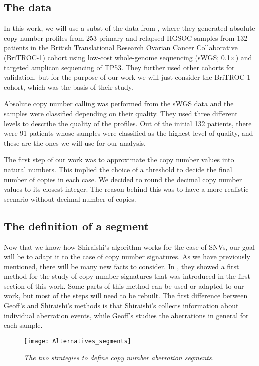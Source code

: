 \documentclass[a4paper]{article}
\begin{document}
\subsection{The data}
In this work, we will use a subst of the data from \cite{Geoff}, where they generated absolute
copy number profiles from 253 primary and relapsed HGSOC samples from 132 patients in the British Translational Research Ovarian Cancer Collaborative (BriTROC-1) cohort using low-cost whole-genome sequencing (sWGS; 0.1$\times$) and targeted amplicon
sequencing of TP53. They further used other cohorts for validation, but for the purpose of our work we will just consider the BriTROC-1 cohort, which was the basis of their study. 

Absolute copy number calling was performed from the sWGS data and the samples were classified depending on their quality. They used three different levels to describe the quality of the profiles. Out of the initial 132 patients, there were 91 patients whose samples were classified as the highest level of quality, and these are the ones we will use for our analysis. 

The first step of our work was to approximate the copy number values into natural numbers. This implied the choice of a threshold to decide the final number of copies in each case. We decided to round the decimal copy number values to its closest integer. The reason behind this was to have a more realistic scenario without decimal number of copies.

\subsection{The definition of a segment}
Now that we know how Shiraishi's algorithm works for the case of SNVs, our goal will be to adapt it to the case of copy number signatures. As we have previously mentioned, there will be many new facts to consider. In \cite{Geoff}, they showed a first method for the study of copy number signatures that was introduced in the first section of this work. Some parts of this method can be used or adapted to our work, but most of the steps will need to be rebuilt. The first difference between Geoff's and Shiraishi's methods is that Shiraishi's collects information about individual aberration events, while Geoff's studies the aberrations in general for each sample. 

\begin{figure}[h] 
	\centering
	\texttt{[image: Alternatives\_segments]} 
	\caption{\textit{The two strategies to define copy number aberration segments.}} \label{AltSegs}
\end{figure}
\end{document}
